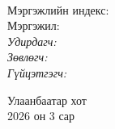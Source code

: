 \begin{titlepage}
\begin{center}

{\scshape\LARGE \univname\par} %
{\scshape\Large \facname\par}\vspace{0.5cm} %

\vspace{2cm}
\hfill \large{\deptname} \\

\vspace{2cm}

{\huge \bfseries \ttitle\par}\vspace{0.4cm} %

\vspace{2cm}

\begin{minipage}[t] {0.9\textwidth}
\begin{flushleft} 
\normalsize

Мэргэжлийн индекс: \degreeid \\
Мэргэжил: \degreename \\[2cm]

\emph{Удирдагч:} {\supname} \\%
\emph{Зөвлөгч:} {\advicename} \\ %
\emph{Гүйцэтгэгч:} {\shortname} \\ %

\end{flushleft}
\end{minipage}

\vfill

\large {Улаанбаатар хот} \\
{\large 2026 он 3 сар}\\ %

\end{center}
\end{titlepage}

 